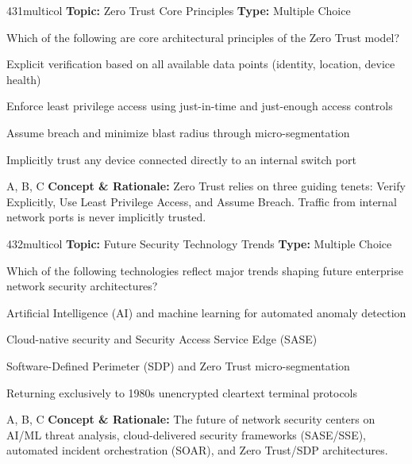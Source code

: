 \begin{qcard}{431}{multicol}
\textcolor{darkslate!75}{\small\textbf{Topic:} Zero Trust Core Principles \hfill \textbf{Type:} Multiple Choice}\vspace{0.4em}\par
Which of the following are core architectural principles of the Zero Trust model?
\begin{qoptions}
\item Explicit verification based on all available data points (identity, location, device health)
\item Enforce least privilege access using just-in-time and just-enough access controls
\item Assume breach and minimize blast radius through micro-segmentation
\item Implicitly trust any device connected directly to an internal switch port
\end{qoptions}
\end{qcard}
\nopagebreak
\begin{explainbox}{A, B, C}
\textbf{Concept \& Rationale:} Zero Trust relies on three guiding tenets: Verify Explicitly, Use Least Privilege Access, and Assume Breach. Traffic from internal network ports is never implicitly trusted.
\end{explainbox}

\begin{qcard}{432}{multicol}
\textcolor{darkslate!75}{\small\textbf{Topic:} Future Security Technology Trends \hfill \textbf{Type:} Multiple Choice}\vspace{0.4em}\par
Which of the following technologies reflect major trends shaping future enterprise network security architectures?
\begin{qoptions}
\item Artificial Intelligence (AI) and machine learning for automated anomaly detection
\item Cloud-native security and Security Access Service Edge (SASE)
\item Software-Defined Perimeter (SDP) and Zero Trust micro-segmentation
\item Returning exclusively to 1980s unencrypted cleartext terminal protocols
\end{qoptions}
\end{qcard}
\nopagebreak
\begin{explainbox}{A, B, C}
\textbf{Concept \& Rationale:} The future of network security centers on AI/ML threat analysis, cloud-delivered security frameworks (SASE/SSE), automated incident orchestration (SOAR), and Zero Trust/SDP architectures.
\end{explainbox}

